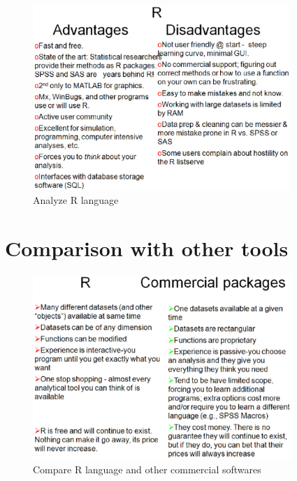 \begin{figure}[htb]
    \centerline{\includegraphics[height=7cm]{./images/R_strong_weak.eps}}
    \caption{Analyze R language}\label{fig:R_strong_weak}
  \end{figure}


\section{Comparison with other tools}
\label{sec:comp-with-other}


\begin{figure}[htb]
    \centerline{\includegraphics[height=7cm]{./images/R_others.eps}}
    \caption{Compare R language and other commercial softwares}\label{fig:R_others}
  \end{figure}


